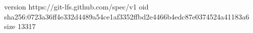 version https://git-lfs.github.com/spec/v1
oid sha256:0723a36ff4e332d4489a54ce1af3352ffbd2e4466b4edc87e0374524a41183a6
size 13317
